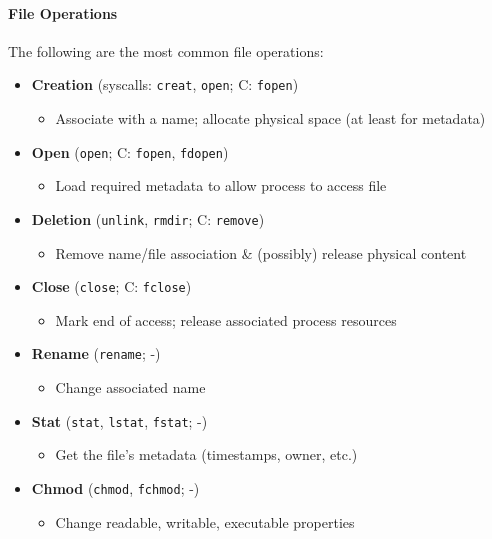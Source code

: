 \documentclass[openany,12pt]{book}
\begin{document}
\paragraph{File Operations} The following are the most common file operations:
\begin{itemize}
    \item \textbf{Creation} (syscalls: \texttt{creat}, \texttt{open}; C: \texttt{fopen})
    \begin{itemize}
        \item Associate with a name; allocate physical space (at least for metadata)
    \end{itemize}

    \item \textbf{Open} (\texttt{open}; C: \texttt{fopen}, \texttt{fdopen})
    \begin{itemize}
        \item Load required metadata to allow process to access file
    \end{itemize}

    \item \textbf{Deletion} (\texttt{unlink}, \texttt{rmdir}; C: \texttt{remove})
    \begin{itemize}
        \item Remove name/file association \& (possibly) release physical content
    \end{itemize}

    \item \textbf{Close} (\texttt{close}; C: \texttt{fclose})
    \begin{itemize}
        \item Mark end of access; release associated process resources
    \end{itemize}

    \item \textbf{Rename} (\texttt{rename}; -)
    \begin{itemize}
        \item Change associated name
    \end{itemize}

    \item \textbf{Stat} (\texttt{stat}, \texttt{lstat}, \texttt{fstat}; -)
    \begin{itemize}
        \item Get the file's metadata (timestamps, owner, etc.)
    \end{itemize}

    \item \textbf{Chmod} (\texttt{chmod}, \texttt{fchmod}; -)
    \begin{itemize}
        \item Change readable, writable, executable properties
    \end{itemize}
    

\end{itemize}
\end{document}
